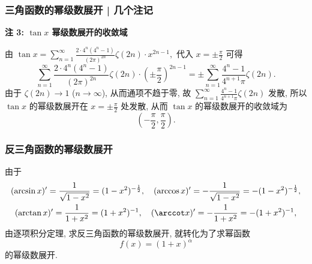 
\begin{frame}
\frametitle{三角函数的幂级数展开 | 几个注记}

{\color{red} } \textbf{注 3: $\tan x$ 幂级数展开的收敛域}
\vspace{0.5em}

由 $\tan x = \sum_{n=1}^\infty \frac{2 \cdot 4^n (4^n - 1)}{(2\pi)^{2n}} \zeta(2n) \cdot x^{2n-1},$ 代入 $x = \pm \frac{\pi}{2}$ 可得
\[
\sum_{n=1}^\infty \frac{2 \cdot 4^n (4^n - 1)}{(2\pi)^{2n}} \zeta(2n) \cdot \left( \pm \frac{\pi}{2} \right)^{2n-1} = \pm \sum_{n=1}^\infty \frac{4^n - 1}{4^{n+1}\pi} \zeta(2n).
\]
由于 $\zeta(2n) \to 1$ ($n \to \infty$), 从而通项不趋于零, 故 $\sum_{n=1}^\infty \frac{4^n - 1}{4^{n+1}\pi} \zeta(2n)$ 发散, 所以 $\tan x$ 的幂级数展开在 $x = \pm \frac{\pi}{2}$ 处发散, 从而 $\tan x$ 的幂级数展开的收敛域为
\[
\left( -\frac{\pi}{2}, \frac{\pi}{2} \right).
\]

\end{frame}


\begin{frame}
\frametitle{反三角函数的幂级数展开}

由于
\begin{gather*}
(\arcsin x)' = \frac{1}{\sqrt{1 - x^2}} = (1 - x^2)^{-\frac{1}{2}}, \quad (\arccos x)' = - \frac{1}{\sqrt{1 - x^2}} = - (1 - x^2)^{-\frac{1}{2}}, \\
(\arctan x)' = \frac{1}{1 + x^2} = (1 + x^2)^{-1}, \quad (\arccot x)' = - \frac{1}{1 + x^2} = - (1 + x^2)^{-1},
\end{gather*}
由逐项积分定理, 求反三角函数的幂级数展开, 就转化为了求幂函数
\[
f(x) = (1 + x)^{\alpha}
\]
的幂级数展开.

\end{frame}


